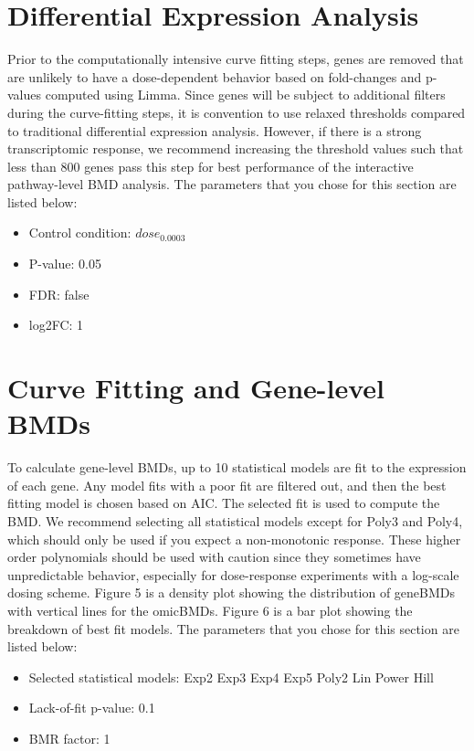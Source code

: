 \documentclass[a4paper]{article}
\begin{document}
\section{Differential Expression Analysis}
 Prior to the computationally intensive curve fitting steps, genes are removed that are unlikely to have a dose-dependent behavior  based on fold-changes and p-values computed using Limma. Since genes will be subject to additional filters during the curve-fitting  steps, it is convention to use relaxed thresholds compared to traditional differential expression analysis. However, if there is a  strong transcriptomic response, we recommend increasing the threshold values such that less than 800 genes pass this step for best  performance of the interactive pathway-level BMD analysis. The parameters that you chose for this section are listed below:  \begin{itemize} \item{Control condition: $ dose_0.0003 $} \item{P-value:  0.05 } \item{FDR:  false } \item{log2FC:  1 } \end{itemize} 

\section{Curve Fitting and Gene-level BMDs}
 To calculate gene-level BMDs, up to 10 statistical models are fit to the expression of each gene. Any model  fits with a poor fit are filtered out, and then the best fitting model is chosen based on AIC. The selected fit is  used to compute the BMD. We recommend selecting all statistical models except for Poly3 and Poly4, which should only  be used if you expect a non-monotonic response. These higher order polynomials should be used with caution since they  sometimes have unpredictable behavior, especially for dose-response experiments with a log-scale dosing scheme.  Figure 5 is a density plot showing the distribution of geneBMDs with vertical lines for the omicBMDs. Figure 6  is a bar plot showing the breakdown of best fit models. The parameters that you chose for this section are listed below:  \begin{itemize} \item{Selected statistical models:  Exp2 Exp3 Exp4 Exp5 Poly2 Lin Power Hill } \item{Lack-of-fit p-value:  0.1 } \item{BMR factor:  1 } \end{itemize} 
\end{document}
